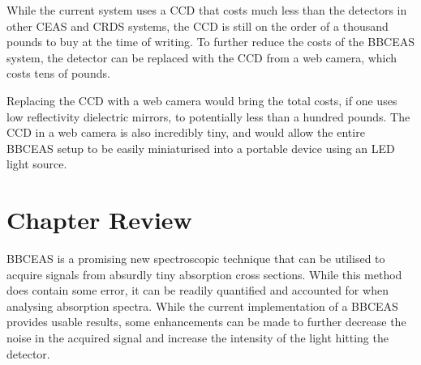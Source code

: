 While the current system uses a \ac{CCD} that costs much less than the
detectors in other \ac{CEAS} and \ac{CRDS} systems, the \ac{CCD} is still on
the order of a thousand pounds to buy at the time of writing. To further reduce
the costs of the \ac{BBCEAS} system, the detector can be replaced with the
\ac{CCD} from a web camera, which costs tens of pounds.

Replacing the \ac{CCD} with a web camera would bring the total costs, if one
uses low reflectivity dielectric mirrors, to potentially less than a hundred
pounds. The \ac{CCD} in a web camera is also incredibly tiny, and would allow
the entire \ac{BBCEAS} setup to be easily miniaturised into a portable device
using an \ac{LED} light source.


\section*{Chapter Review}

\ac{BBCEAS} is a promising new spectroscopic technique that can be utilised to
acquire signals from absurdly tiny absorption cross sections. While this
method does contain some error, it can be readily quantified and accounted for
when analysing absorption spectra. While the current implementation of a
\ac{BBCEAS} provides usable results, some enhancements can be made to further
decrease the noise in the acquired signal and increase the intensity of the
light hitting the detector.
